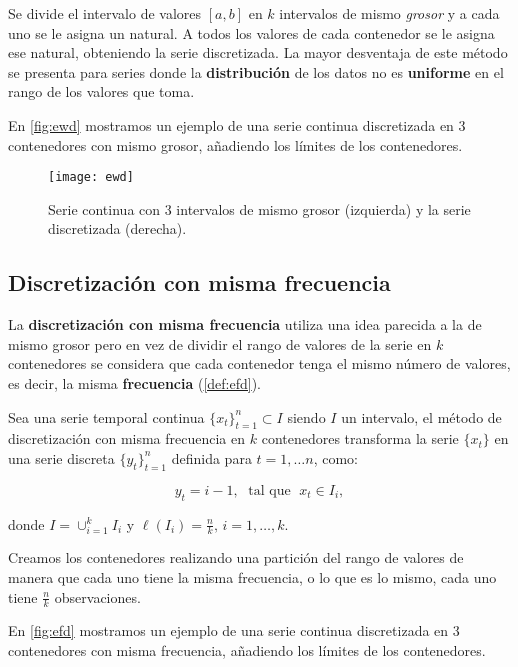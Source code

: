 Se divide el intervalo de valores $[a, b]$ en $k$ intervalos de mismo \emph{grosor} y a cada uno se le asigna un natural. A todos los valores de cada contenedor se le asigna ese natural, obteniendo la serie discretizada. La mayor desventaja de este método se presenta para series donde la \textbf{distribución} de los datos no es \textbf{uniforme} en el rango de los valores que toma.

En \autoref{fig:ewd} mostramos un ejemplo de una serie continua discretizada en 3 contenedores con mismo grosor, añadiendo los límites de los contenedores.

\begin{figure}[htpb]
  \centering
  \texttt{[image: ewd]}
  \caption{Serie continua con 3 intervalos de mismo grosor (izquierda) y la serie discretizada (derecha).}
  \label{fig:ewd}
\end{figure}

\subsection{Discretización con misma frecuencia}

La \textbf{discretización con misma frecuencia} utiliza una idea parecida a la de mismo grosor pero en vez de dividir el rango de valores de la serie en $k$ contenedores se considera que cada contenedor tenga el mismo número de valores, es decir, la misma \textbf{frecuencia} (\autoref{def:efd}).

\begin{definicion}
  Sea una serie temporal continua $\{x_t\}_{t = 1}^n \subset I$  siendo $I$ un intervalo, el método de discretización con misma frecuencia en $k$ contenedores transforma la serie $\{x_t\}$ en una serie discreta $\{y_t\}_{t = 1}^n$ definida para $t = 1, \ldots n$, como:

  $$y_t = i-1, \; \text{ tal que } \; x_t \in I_i,$$

  donde $I = \cup_{i = 1}^k I_i$ y $\ell(I_i) = \frac{n}{k}, \, i = 1, \ldots, k$.
  \label{def:efd}
\end{definicion}

Creamos los contenedores realizando una partición del rango de valores de manera que cada uno tiene la misma frecuencia, o lo que es lo mismo, cada uno tiene $\frac{n}{k}$ observaciones.

En \autoref{fig:efd} mostramos un ejemplo de una serie continua discretizada en 3 contenedores con misma frecuencia, añadiendo los límites de los contenedores.


